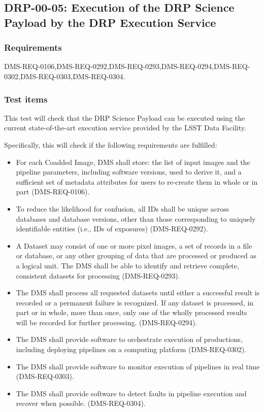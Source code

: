 \subsection{DRP-00-05: Execution of the DRP Science Payload by the DRP Execution Service}
\label{drp-00-05}

\subsubsection{Requirements}

DMS-REQ-0106,DMS-REQ-0292,DMS-REQ-0293,DMS-REQ-0294,DMS-REQ-0302,DMS-REQ-0303,DMS-REQ-0304.

\subsubsection{Test items}

This test will check that the DRP Science Payload can be executed using the current state-of-the-art execution service provided by the LSST Data Facility.

Specifically, this will check if the following requirements are fulfilled:

\begin{itemize}
  \item{For each Coadded Image, DMS shall store: the list of input images and the pipeline parameters, including software versions, used to derive it, and a sufficient set of metadata attributes for users to re-create them in whole or in part (DMS-REQ-0106).}
  \item{To reduce the likelihood for confusion, all IDs shall be unique across databases and database versions, other than those corresponding to uniquely identifiable entities (i.e., IDs of exposures) (DMS-REQ-0292).}
  \item{A Dataset may consist of one or more pixel images, a set of records in a file or database, or any other grouping of data that are processed or produced as a logical unit. The DMS shall be able to identify and retrieve complete, consistent datasets for processing (DMS-REQ-0293).}
  \item{The DMS shall process all requested datasets until either a successful result is recorded or a permanent failure is recognized. If any dataset is processed, in part or in whole, more than once, only one of the wholly processed results will be recorded for further processing.
(DMS-REQ-0294).}
  \item{The DMS shall provide software to orchestrate execution of productions, including deploying pipelines on a computing platform (DMS-REQ-0302).}
  \item{The DMS shall provide software to monitor execution of pipelines in real time (DMS-REQ-0303).}
  \item{The DMS shall provide software to detect faults in pipeline execution and recover when possible.
(DMS-REQ-0304).}

\end{itemize}

